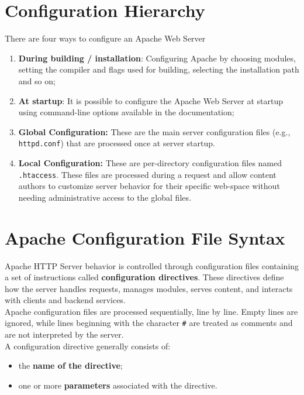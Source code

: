 \documentclass{scrbook}
\begin{document}
	\section{Configuration Hierarchy}
	
	There are four ways to configure an Apache Web Server
	
	\begin{enumerate}
		\item \textbf{During building / installation}: Configuring Apache by choosing modules, setting the compiler and flags used for building, selecting the installation path and so on;
		
		\item \textbf{At startup}: It is possible to configure the Apache Web Server at startup using command-line options available in the documentation; 
		
		\item \textbf{Global Configuration:} These are the main server configuration files (e.g., \texttt{httpd.conf}) that are processed once at server startup.
		
		\item \textbf{Local Configuration:} These are per-directory configuration files named \texttt{.htaccess}. These files are processed during a request and allow content authors to customize server behavior for their specific web-space without needing administrative access to the global files.
	\end{enumerate}
	
	\section{Apache Configuration File Syntax}
	
	Apache HTTP Server behavior is controlled through configuration files containing a set of instructions called \textbf{configuration directives}. These directives define how the server handles requests, manages modules, serves content, and interacts with clients and backend services.\\
	
	Apache configuration files are processed sequentially, line by line. Empty lines are ignored, while lines beginning with the character \texttt{\#} are treated as comments and are not interpreted by the server.\\
	
	A configuration directive generally consists of:
	\begin{itemize}
		\item the \textbf{name of the directive};
		\item one or more \textbf{parameters} associated with the directive.
	\end{itemize}
	
\end{document}
